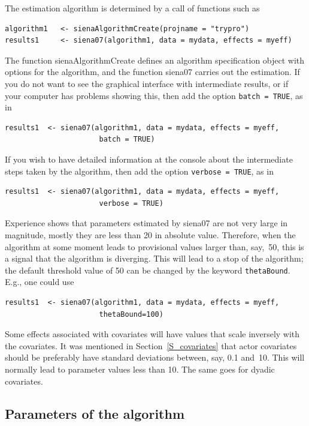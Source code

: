 \documentclass[a4paper,fleqn,11pt]{article}
\newcommand{\+}{\, + \,}
\newcommand{\sfn}[1]{\textsf{#1}}
\begin{document}
The estimation algorithm is determined by a call of functions
such as
\begin{verbatim}
algorithm1   <- sienaAlgorithmCreate(projname = "trypro")
results1     <- siena07(algorithm1, data = mydata, effects = myeff)
\end{verbatim}
The function \textsf{sienaAlgorithmCreate} defines an algorithm specification
object with options for the algorithm, and the function  \textsf{siena07}
carries out the estimation.
If you do not want to see the graphical interface with intermediate
results, or if your computer has problems showing this, then add
the option \texttt{batch = TRUE}, as in
\begin{verbatim}
results1  <- siena07(algorithm1, data = mydata, effects = myeff,
                      batch = TRUE)
\end{verbatim}
If you wish to have detailed information at the console about the intermediate
steps taken by the algorithm, then add
the option \texttt{verbose = TRUE}, as in
\begin{verbatim}
results1  <- siena07(algorithm1, data = mydata, effects = myeff,
                      verbose = TRUE)
\end{verbatim}

Experience shows that parameters estimated by \sfn{siena07} are
not very large in magnitude, mostly they are less than 20 in
absolute value. Therefore, when the algorithm at some moment leads to
provisional values larger than, say,~50, this is a signal that the
algorithm is diverging. This will lead to a stop of the algorithm;
the default threshold value of 50 can be changed by the keyword
\texttt{thetaBound}. E.g., one could use
\begin{verbatim}
results1  <- siena07(algorithm1, data = mydata, effects = myeff,
                      thetaBound=100)
\end{verbatim}
Some effects associated with covariates will have values that scale
inversely with the covariates.
It was mentioned in Section~\ref{S_covariates} that actor
covariates should be preferably have standard deviations between, say,
0.1 and~10. This will normally lead to parameter values less than 10.
The same goes for dyadic covariates.

\subsection{Parameters of the algorithm}
\label{S_param}
\end{document}
